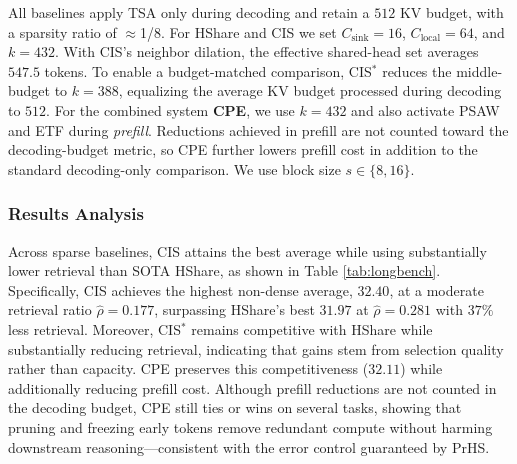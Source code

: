 All baselines apply TSA only during decoding and retain a $512$ KV budget, with a sparsity ratio of ${\approx}$1/8. For HShare and CIS we set $C_{\text{sink}}{=}16$, $C_{\text{local}}{=}64$, and $k{=}432$. With CIS’s neighbor dilation, the effective shared-head set averages $547.5$ tokens. To enable a budget-matched comparison, CIS$^\ast$ reduces the middle-budget to $k{=}388$, equalizing the average KV budget processed during decoding to $512$. For the combined system \textbf{CPE}, we use $k{=}432$ and also activate PSAW and ETF during \emph{prefill}. Reductions achieved in prefill are not counted toward the decoding-budget metric, so CPE further lowers prefill cost in addition to the standard decoding-only comparison. We use block size $s\in\{8,16\}$.

\subsubsection{Results Analysis}

Across sparse baselines, CIS attains the best average while using substantially lower retrieval than SOTA HShare, as shown in Table \ref{tab:longbench}. Specifically, CIS achieves the highest non-dense average, $32.40$, at a moderate retrieval ratio $\hat{\rho}{=}0.177$, surpassing HShare’s best $31.97$ at $\hat{\rho}{=}0.281$ with $37\%$ less retrieval. Moreover, CIS$^{\ast}$ remains competitive with HShare while substantially reducing retrieval, indicating that gains stem from selection quality rather than capacity. CPE preserves this competitiveness ($32.11$) while additionally reducing prefill cost. Although prefill reductions are not counted in the decoding budget, CPE still ties or wins on several tasks, showing that pruning and freezing early tokens remove redundant compute without harming downstream reasoning—consistent with the error control guaranteed by PrHS.


